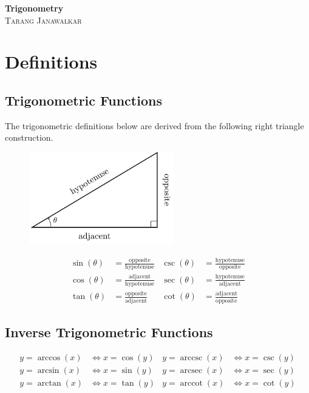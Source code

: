\documentclass{article}
\author{Tarang Janawalkar}
\date{}
\DeclareMathOperator{\arccot}{arccot}
\DeclareMathOperator{\arcsec}{arcsec}
\DeclareMathOperator{\arccsc}{arccsc}
\newcommand{\docTitle}{Trigonometry}
\begin{document}
%
\begin{titlepage}
    \vspace*{\fill}
    \begin{center}
        \LARGE\textbf{\docTitle}\\[0.2in]
        \normalsize\textsc{Tarang Janawalkar}
    \end{center}
    \vspace*{\fill}
    \doclicenseThis
    \thispagestyle{empty}
\end{titlepage}
\newpage
%
\tableofcontents
\newpage
%
\renewcommand*{\arraystretch}{1.25}
\section{Definitions}
\subsection{Trigonometric Functions}
The trigonometric definitions below are derived from the following
right triangle construction.
\begin{figure}[H]
    \centering
    \includegraphics[height = 4cm, keepaspectratio = true]{figures/right-triangle.pdf}
\end{figure}
\begin{align*}
    \sin{\left( \theta \right)} & = \frac{\text{opposite}}{\text{hypotenuse}} & \csc{\left( \theta \right)} & = \frac{\text{hypotenuse}}{\text{opposite}} \\
    \cos{\left( \theta \right)} & = \frac{\text{adjacent}}{\text{hypotenuse}} & \sec{\left( \theta \right)} & = \frac{\text{hypotenuse}}{\text{adjacent}} \\
    \tan{\left( \theta \right)} & = \frac{\text{opposite}}{\text{adjacent}}   & \cot{\left( \theta \right)} & = \frac{\text{adjacent}}{\text{opposite}}
\end{align*}
\subsection{Inverse Trigonometric Functions}
\begin{align*}
    y = \arccos{\left( x \right)} & \iff x = \cos{\left( y \right)} & y = \arccsc{\left( x \right)} & \iff x = \csc{\left( y \right)} \\
    y = \arcsin{\left( x \right)} & \iff x = \sin{\left( y \right)} & y = \arcsec{\left( x \right)} & \iff x = \sec{\left( y \right)} \\
    y = \arctan{\left( x \right)} & \iff x = \tan{\left( y \right)} & y = \arccot{\left( x \right)} & \iff x = \cot{\left( y \right)}
\end{align*}
\end{document}
